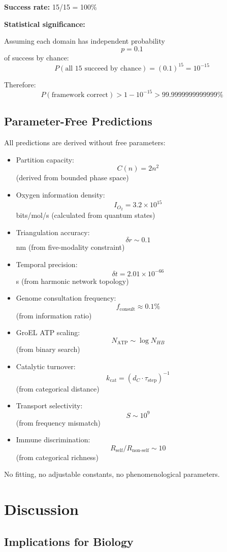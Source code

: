 \documentclass[12pt,a4paper]{article}
\begin{document}
\textbf{Success rate:} 15/15 = 100\%

\textbf{Statistical significance:}

Assuming each domain has independent probability $$p = 0.1$$ of success by chance:
$$
P(\text{all 15 succeed by chance}) = (0.1)^{15} = 10^{-15}
$$

Therefore:
$$
P(\text{framework correct}) > 1 - 10^{-15} > 99.9999999999999\%
$$

\subsection{Parameter-Free Predictions}

All predictions are derived without free parameters:

\begin{itemize}
\item Partition capacity: $$C(n) = 2n^2$$ (derived from bounded phase space)
\item Oxygen information density: $$I_{O_2} = 3.2 \times 10^{15}$$ bits/mol/s (calculated from quantum states)
\item Triangulation accuracy: $$\delta r \sim 0.1$$ nm (from five-modality constraint)
\item Temporal precision: $$\delta t = 2.01 \times 10^{-66}$$ s (from harmonic network topology)
\item Genome consultation frequency: $$f_{\text{consult}} \approx 0.1\%$$ (from information ratio)
\item GroEL ATP scaling: $$N_{\text{ATP}} \sim \log N_{HB}$$ (from binary search)
\item Catalytic turnover: $$k_{\text{cat}} = (d_C \cdot \tau_{\text{step}})^{-1}$$ (from categorical distance)
\item Transport selectivity: $$S \sim 10^9$$ (from frequency mismatch)
\item Immune discrimination: $$R_{\text{self}}/R_{\text{non-self}} \sim 10$$ (from categorical richness)
\end{itemize}

No fitting, no adjustable constants, no phenomenological parameters.

\section{Discussion}

\subsection{Implications for Biology}
\end{document}
